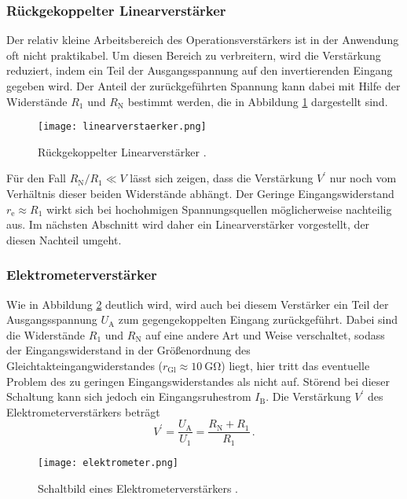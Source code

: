 \documentclass[
  bibliography=totoc,     %
  captions=tableheading,  %
  titlepage=firstiscover, %
]{scrartcl}
\begin{document}
\subsubsection{Rückgekoppelter Linearverstärker}
\label{subsubsec:rueck-linearverstärker}
Der relativ kleine Arbeitsbereich des Operationsverstärkers ist in der
Anwendung oft nicht praktikabel. Um diesen Bereich zu verbreitern, wird die
Verstärkung reduziert, indem ein Teil der Ausgangsspannung auf den
invertierenden Eingang gegeben wird.
Der Anteil der zurückgeführten Spannung kann dabei mit Hilfe der Widerstände
$R_1$ und $R_\text{N}$ bestimmt werden, die in Abbildung \ref{fig:linear}
dargestellt sind.
\begin{figure}
    \centering
    \texttt{[image: linearverstaerker.png]}
    \caption{Rückgekoppelter Linearverstärker \cite{V51}.}
    \label{fig:linear}
\end{figure}
Für den Fall $R_\text{N}/R_1 \ll V$
lässt sich zeigen, dass die Verstärkung $V^\prime$ nur noch vom Verhältnis
dieser beiden Widerstände abhängt.
Der Geringe Eingangswiderstand $r_\text{e} \approx R_1$ wirkt sich bei
hochohmigen Spannungsquellen möglicherweise nachteilig aus. Im nächsten
Abschnitt wird daher ein Linearverstärker vorgestellt, der diesen Nachteil
umgeht.

\subsubsection{Elektrometerverstärker}
\label{subsubsec:elektrometerverstärker}
Wie in Abbildung \ref{fig:elektrometer} deutlich wird, wird auch bei diesem
Verstärker ein Teil der Ausgangsspannung $U_\text{A}$ zum gegengekoppelten
Eingang zurückgeführt. Dabei sind die Widerstände $R_1$ und $R_\text{N}$ auf
eine andere Art und Weise verschaltet, sodass der Eingangswiderstand in der
Größenordnung des Gleichtakteingangwiderstandes
($r_\text{Gl} \approx \SI{10}{\giga\ohm}$) liegt, hier tritt das eventuelle
Problem des zu geringen Eingangswiderstandes als nicht auf.
Störend bei dieser Schaltung kann sich jedoch ein Eingangsruhestrom
$I_\text{B}$.
Die Verstärkung $V^\prime$ des Elektrometerverstärkers beträgt
\begin{equation*}
    V^\prime = \frac{U_\text{A}}{U_1} = \frac{R_\text{N} + R_1}{R_1}\,.
\end{equation*}
\begin{figure}
    \centering
    \texttt{[image: elektrometer.png]}
    \caption{Schaltbild eines Elektrometerverstärkers \cite{V51}.}
    \label{fig:elektrometer}
\end{figure}
\end{document}
